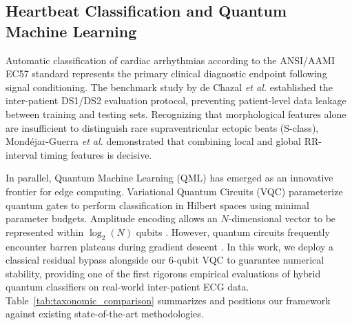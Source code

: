 \subsection{Heartbeat Classification and Quantum Machine Learning}
Automatic classification of cardiac arrhythmias according to the ANSI/AAMI EC57 standard \cite{aami} represents the primary clinical diagnostic endpoint following signal conditioning. The benchmark study by de Chazal \emph{et al.} \cite{dechazal2004} established the inter-patient DS1/DS2 evaluation protocol, preventing patient-level data leakage between training and testing sets. Recognizing that morphological features alone are insufficient to distinguish rare supraventricular ectopic beats (S-class), Mond{\'e}jar-Guerra \emph{et al.} \cite{mondejar2019} demonstrated that combining local and global RR-interval timing features is decisive.

In parallel, Quantum Machine Learning (QML) has emerged as an innovative frontier for edge computing. Variational Quantum Circuits (VQC) \cite{benedetti2019} parameterize quantum gates to perform classification in Hilbert spaces using minimal parameter budgets. Amplitude encoding allows an $N$-dimensional vector to be represented within $\log_2(N)$ qubits \cite{pennylane2018}. However, quantum circuits frequently encounter barren plateaus during gradient descent \cite{mcclean2018}. In this work, we deploy a classical residual bypass alongside our 6-qubit VQC to guarantee numerical stability, providing one of the first rigorous empirical evaluations of hybrid quantum classifiers on real-world inter-patient ECG data. Table~\ref{tab:taxonomic_comparison} summarizes and positions our framework against existing state-of-the-art methodologies.
